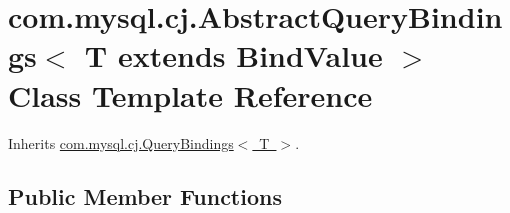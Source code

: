 \hypertarget{classcom_1_1mysql_1_1cj_1_1_abstract_query_bindings}{}\section{com.\+mysql.\+cj.\+Abstract\+Query\+Bindings$<$ T extends Bind\+Value $>$ Class Template Reference}
\label{classcom_1_1mysql_1_1cj_1_1_abstract_query_bindings}


Inherits \mbox{\hyperlink{interfacecom_1_1mysql_1_1cj_1_1_query_bindings}{com.\+mysql.\+cj.\+Query\+Bindings$<$ T $>$}}.

\subsection*{Public Member Functions}
